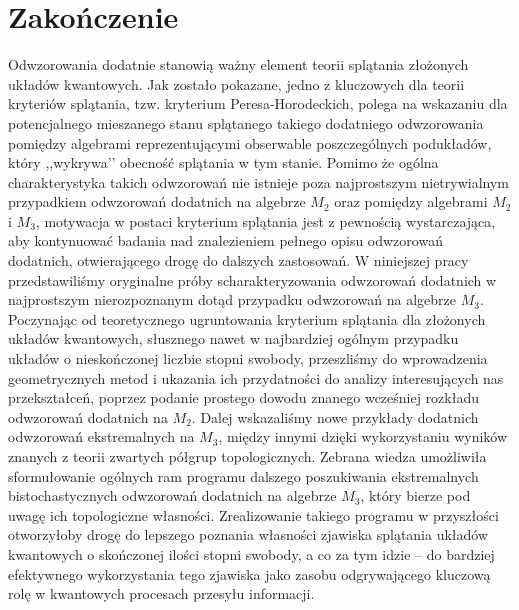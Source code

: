 \chapter{Zakończenie}
    \label{chap:Zakończenie}

Odwzorowania dodatnie stanowią ważny element teorii splątania złożonych
układów kwantowych.
Jak zostało pokazane, jedno z kluczowych dla teorii kryteriów splątania,
tzw. kryterium Peresa-Horodeckich,
polega na wskazaniu dla potencjalnego mieszanego stanu splątanego takiego
dodatniego odwzorowania pomiędzy algebrami reprezentującymi obserwable
poszczególnych podukładów, który ,,wykrywa’’ obecność splątania w tym stanie.
Pomimo że ogólna charakterystyka takich odwzorowań nie istnieje poza
najprostszym nietrywialnym przypadkiem odwzorowań dodatnich na algebrze
$M_{2}$ oraz pomiędzy algebrami $M_{2}$ i $M_{3}$, motywacja w postaci kryterium
splątania jest z pewnością wystarczająca,
aby kontynuować badania nad znalezieniem pełnego opisu odwzorowań dodatnich,
otwierającego drogę do dalszych zastosowań.
W niniejszej pracy przedstawiliśmy oryginalne próby scharakteryzowania
odwzorowań dodatnich w najprostszym nierozpoznanym dotąd przypadku odwzorowań
na algebrze $M_{3}$.
Poczynając od teoretycznego ugruntowania kryterium splątania dla złożonych
układów kwantowych,
słusznego nawet w najbardziej ogólnym przypadku układów
o nieskończonej liczbie stopni swobody,
przeszliśmy do wprowadzenia geometrycznych metod i ukazania ich przydatności do
analizy interesujących nas przekształceń,
poprzez podanie prostego dowodu znanego wcześniej rozkładu
odwzorowań dodatnich na $M_{2}$.
Dalej wskazaliśmy nowe przykłady dodatnich odwzorowań ekstremalnych na $M_{3}$,
między innymi dzięki wykorzystaniu wyników znanych
z teorii zwartych półgrup topologicznych.
Zebrana wiedza umożliwiła sformułowanie ogólnych ram programu dalszego
poszukiwania ekstremalnych bistochastycznych odwzorowań dodatnich
na algebrze $M_{3}$,
który bierze pod uwagę ich topologiczne własności.
Zrealizowanie takiego programu w przyszłości otworzyłoby drogę do lepszego
poznania własności zjawiska splątania układów kwantowych o skończonej ilości
stopni swobody,
a co za tym idzie -- do bardziej efektywnego wykorzystania tego zjawiska jako
zasobu odgrywającego kluczową rolę w kwantowych procesach przesyłu informacji.

